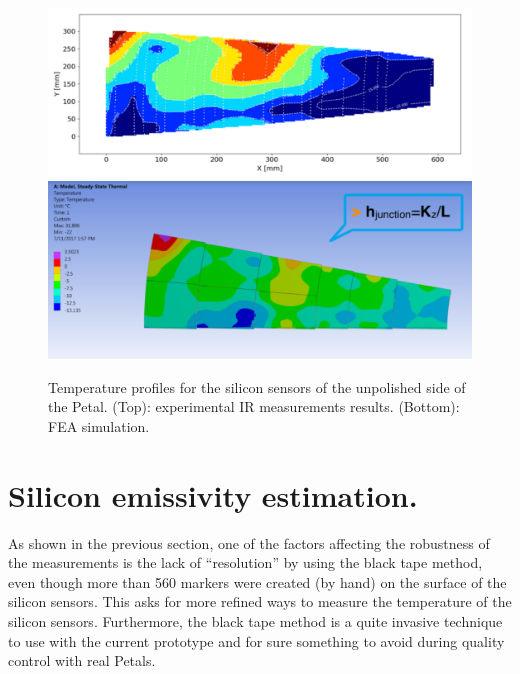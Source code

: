 		\begin{figure}[ht!]
			\centering
			\captionsetup{justification=centering,margin=0cm}
			\includegraphics[scale=0.35]{Figures/Chapter04/PetalLinearInterpolation.jpg}
			\includegraphics[scale=0.35]{Figures/Chapter04/PetalFEA.jpg}
			\caption{Temperature profiles for the silicon sensors of the unpolished side of the Petal. (Top): experimental IR measurements results. (Bottom): FEA simulation.}\label{fig4.3}
		\end{figure}	
	
	\section{Silicon emissivity estimation.}\label{section4.3}	
	
		As shown in the previous section, one of the factors affecting the robustness of the measurements is the lack of “resolution” by using the black tape method, even though more than 560 markers were created (by hand) on the surface of the silicon sensors. This asks for more refined ways to measure the temperature of the silicon sensors. Furthermore, the black tape method is a quite invasive technique to use with the current prototype and for sure something to avoid during quality control with real Petals.
		
